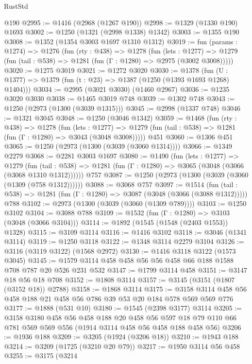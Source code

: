 \begin{lexlean}{RustStd}
\begin{coremodule}
{\begin{coremodule}
{{{{{{{{{{{{{    @190
@2995 := @1416 (@2968 (@1267 @190))
@2998 := @1329 (@1330 @190) @1693
@3002 := @1250 (@1321 (@2998 @1338) @1342)
@3003 := @1355 @190
@3008 := @1352 (@1354 @3003 @1697 @1310 @1312)
@3019 := fun (params : @1274) =>
  @1276
    (fun (rty : @438) =>
    @1278
      (fun (lets : @1277) =>
      @1279 (fun (tail : @538) => @1281 (fun (Γ : @1280) => @2975 (@3002 @3008)))))
@3020 := @1275 @3019
@3021 := @1272 @3020
@3030 := @1378 (fun (U : @1377) => @1379 (fun (t : @23) => @1387 (@1250 (@1393 @1693 @1268) @1404)))
@3034 := @2995 (@3021 @3030) (@1460 @2967)
@3036 := @1235 @3020 @3030
@3038 := @1465 @3019 @748
@3039 := @1302 @748
@3043 := @1250 (@2973 (@1300 (@3039 @1315)))
@3045 := @2998 (@1337 @748)
@3046 := @1321 @3045
@3048 := @1250 (@3046 @1342)
@3059 := @1468
    (fun (rty : @438) =>
    @1278
      (fun (lets : @1277) =>
      @1279 (fun (tail : @538) => @1281 (fun (Γ : @1280) => @3043 (@3048 @3008)))))
    @451
@3060 := @1306 @451
@3065 := @1250 (@2973 (@1300 (@3039 (@3060 @1314))))
@3066 := @1349 @2279
@3068 := @2281 @3003 @1697
@3080 := @1490
    (fun (lets : @1277) =>
    @1279
      (fun (tail : @538) => @1281 (fun (Γ : @1280) => @3065 (@3048 (@3066 (@3068 @1310 @1312))))))
    @757
@3087 := @1250 (@2973 (@1300 (@3039 (@3060 (@1309 (@758 @1312))))))
@3088 := @3068 @757
@3097 := @1514
    (fun (tail : @538) => @1281 (fun (Γ : @1280) => @3087 (@3048 (@3066 (@3088 @1312)))))
    @788
@3102 := @2973 (@1300 (@3039 (@3060 (@1309 @789))))
@3103 := @1250 @3102
@3104 := @3088 @788
@3109 := @1532 (fun (Γ : @1280) => @3103 (@3048 (@3066 @3104)))
@3114 := @1892 (@1545 (@1548 (@2403 @1553)) @1328)
@3115 := @3109 @3114
@3116 := @1416 @3102
@3118 := @3046 (@1341 @3114)
@3119 := @1250 @3118
@3122 := @1348 @3114 @2279 @3104
@3126 := @3116 (@3119 @3122) (@1568 @2972)
@3130 := @1416 @3118 @3122 (@1573 @3045)
@3145 := @1579 @3114 @458 @458 @56 @56 @458 @66 @188 @1588 @708 @787 @20 @526 @231 @532
@3147 := @1799 @3114 @458
@3151 := @3147 @18 @56 @18 @708
@3152 := @1808 @3114
@3157 := @3145 (@3151 (@1807 (@3152 @18)) @2788)
@3158 := @1868 @3114
@3175 := @3158 @3114 @458 @56 @458 @188 @21 @458 @56 @786 @39 @53 @20 @184 @578 @569 @569 @776
@3177 := @1888 (@531 @10)
@3180 := @1545 (@2398 @3177) @3114
@3205 := @3158
    @3180
    @458
    @56
    @458
    @188
    @20
    @458
    @56
    @597
    @18
    @79
    @110
    @66
    @781
    @569
    @569
    @556
    (@1914 @3114 @458 @56 @458 @188 @458 @56)
@3206 := @1936 @188
@3209 := @3205 (@1924 (@3206 @18))
@3210 := @1943 @188
@3214 := @3209 (@1725 (@3210 @20 @79))
@3217 := @1950 @3114 @56 @458
@3255 := @3175
    (@3214
}}}}}}}}}}}}}
\end{coremodule}}
\end{coremodule}
\end{lexlean}
